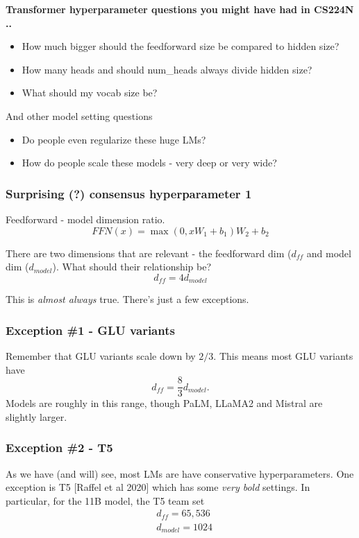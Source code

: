 \documentclass[12pt,twoside]{article}
\begin{document}
\textbf{Transformer hyperparameter questions you might have had in CS224N ..}

\begin{itemize}
    \item How much bigger should the feedforward size be compared to hidden size?
    \item How many heads and should num\_heads always divide hidden size?
    \item What should my vocab size be?
\end{itemize}

And other model setting questions

\begin{itemize}
    \item Do people even regularize these huge LMs?
    \item How do people scale these models - very deep or very wide?
\end{itemize}

\subsubsection*{Surprising (?) consensus hyperparameter 1}

Feedforward - model dimension ratio.
\[
    FFN(x) = \max(0, xW_1 + b_1)W_2 + b_2
\]

There are two dimensions that are relevant - the feedforward dim (\(d_{ff}\) and model dim (\(d_{model}\)). What should their relationship be?
\[
    d_{ff} = 4 d_{model}
\]

This is \textit{almost always} true. There's just a few exceptions. 

\subsubsection*{Exception \#1 - GLU variants}

Remember that GLU variants scale down by \(2 / 3\). This means most GLU variants have 
\[
    d_{ff} = \frac{8}{3}d_{model}.
\]
Models are roughly in this range, though PaLM, LLaMA2 and Mistral are slightly larger.

\subsubsection*{Exception \#2 - T5}

As we have (and will) see, most LMs are have conservative hyperparameters. One exception is T5 [Raffel et al 2020] which has some \textit{very bold} settings. In particular, for the 11B model, the T5 team set
\begin{align*}
    &d_{ff} = 65,536 \\
    &d_{model} = 1024
\end{align*}
\end{document}
